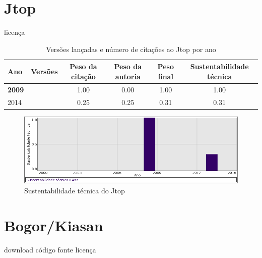 \section{Jtop}
\checkmark licença


\begin{table}[H]
\caption{Versões lançadas e número de citações ao Jtop por ano}
\centering
\begin{tabular}{| l | c | c | c | c | c |}
  \hline
  Ano & Versões & Peso da citação & Peso da autoria & Peso final & Sustentabilidade técnica \\
  \hline
            {\bf 2009}
          &
          
          &
          1.00
          &
          0.00
          &
          1.00
          &
            {\color{blue} 1.00}
          \\
\hline
            2014
          &
          
          &
          0.25
          &
          0.25
          &
          0.31
          &
            {\color{red} 0.31}
          \\
\hline
\end{tabular}
\end{table}

\begin{figure}[h]
  \center
  \includegraphics[scale=0.50]{imagens/softwares-charts/jtop.png}
  \caption{Sustentabilidade técnica do Jtop}
\end{figure}


\section{Bogor/Kiasan}
\checkmark download
\checkmark código fonte
\checkmark licença



